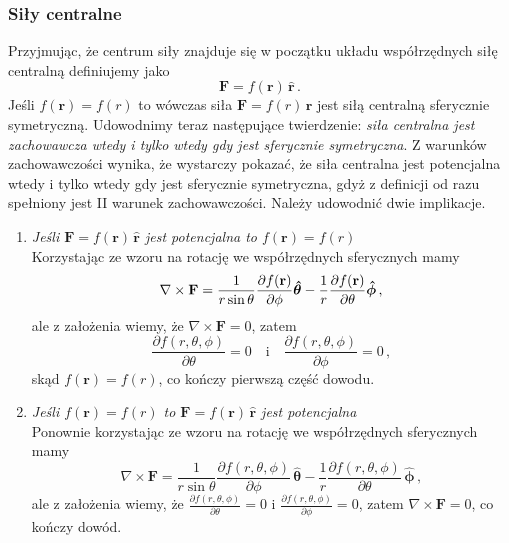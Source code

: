 \documentclass[../main.tex]{subfiles}
\begin{document}
\subsubsection{Siły centralne}
Przyjmując, że centrum siły znajduje się w początku układu współrzędnych siłę centralną definiujemy
jako
\begin{equation*}
    \mathbf{F}=f(\mathbf{r})\,\mathbf{\hat r}\,.
\end{equation*}
Jeśli \(f(\mathbf{r})=f(r)\) to wówczas siła \(\mathbf{F}=f(r)\,\mathbf{\hat r}\) jest siłą
centralną sferycznie symetryczną. Udowodnimy teraz następujące twierdzenie: \textit{siła centralna
jest zachowawcza wtedy i tylko wtedy gdy jest sferycznie symetryczna}. Z warunków zachowawczości
wynika, że wystarczy pokazać, że siła centralna jest potencjalna wtedy i tylko wtedy gdy jest
sferycznie symetryczna, gdyż z definicji od razu spełniony jest II warunek zachowawczości. Należy
udowodnić dwie implikacje.
\begin{enumerate}
    \item \textit{Jeśli \(\mathbf{F}=f(\mathbf{r})\,\mathbf{\hat r}\) jest potencjalna to
    \(f(\mathbf{r})=f(r)\)}\\
    Korzystając ze wzoru na rotację we współrzędnych sferycznych mamy
    \begin{equation*}
        \nabla\times\mathbf{F}=\frac{1}{r\sin\theta}\pdv{f(\mathbf{r})}{\phi}\boldsymbol{\hat\theta}-\frac{1}{r}\pdv{f(\mathbf{r})}{\theta}\boldsymbol{\hat \phi}\,,
    \end{equation*}
    ale z założenia wiemy, że \(\nabla\times\mathbf{F}=0\), zatem 
\begin{equation*}
    \frac{\partial f(r,\theta,\phi)}{\partial \theta}=0\quad\text{i}\quad \frac{\partial f(r,\theta,\phi)}{\partial \phi}=0\,,
\end{equation*}
skąd \(f(\mathbf{r})=f(r)\), co kończy pierwszą część dowodu.

\item \textit{Jeśli \(f(\mathbf{r})=f(r)\) to \(\mathbf{F}=f(\mathbf{r})\,\mathbf{\hat r}\) jest
potencjalna}\\
Ponownie korzystając ze wzoru na rotację we współrzędnych sferycznych mamy
    \begin{equation*}
        \nabla\times\mathbf{F}=\frac{1}{r\sin\theta}\frac{\partial f(r,\theta,\phi)}{\partial \phi}\,\boldsymbol{\hat\theta}-\frac{1}{r}\frac{\partial f(r,\theta,\phi)}{\partial \theta}\,\boldsymbol{\hat \phi}\,,
    \end{equation*}
     ale z założenia wiemy, że \(\frac{\partial f(r,\theta,\phi)}{\partial \theta}=0\) i
     \(\frac{\partial f(r,\theta,\phi)}{\partial \phi}=0\), zatem \(\nabla\times\mathbf{F}=0\), co
     kończy dowód.
\end{enumerate}
\end{document}
